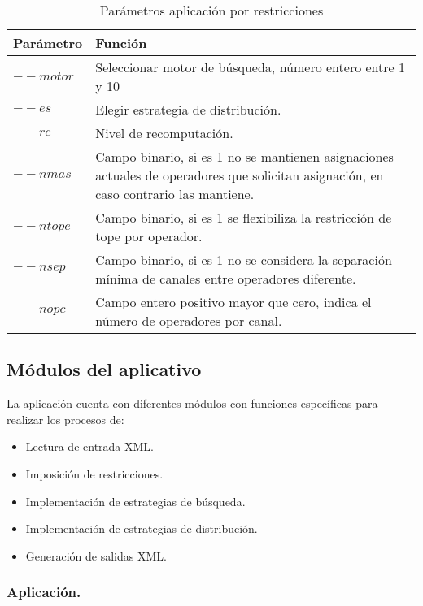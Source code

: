 \begin{center}
\begin{longtable}{|p{3cm}|p{13.5cm}|}
	\caption{Parámetros aplicación por restricciones} \label{table:paramRestri}\\
	\hline
	\cellcolor[gray]{0.9} \textbf{Parámetro} & \cellcolor[gray]{0.9}\textbf{Función} \\
	\hline
	$--motor$ & Seleccionar motor de búsqueda, número entero entre 1 y 10\\
	\hline
	$--es$ &  Elegir estrategia de distribución.\\
	\hline
	$--rc$ &  Nivel de recomputación.\\
	\hline
	$--nmas$ &  Campo binario, si es 1 no se mantienen asignaciones actuales de operadores que solicitan asignación, en caso contrario las mantiene.\\
	\hline
	$--ntope$ & Campo binario, si es 1 se flexibiliza la restricción de tope por operador. \\
	\hline
	$--nsep$ & Campo binario, si es 1 no se considera la separación mínima de canales entre operadores diferente.\\
	\hline
	$--nopc$ & Campo entero positivo mayor que cero, indica el número de operadores por canal.\\
	\hline
\end{longtable}	
\end{center}

\subsection{Módulos del aplicativo}

La aplicación cuenta con diferentes módulos con funciones específicas para realizar los procesos de:

\begin{itemize}
	\item Lectura de entrada XML.
	\item Imposición de restricciones.
	\item Implementación de estrategias de búsqueda.
	\item Implementación de estrategias de distribución.
	\item Generación de salidas XML.
\end{itemize}

\subsubsection{Aplicación.}

